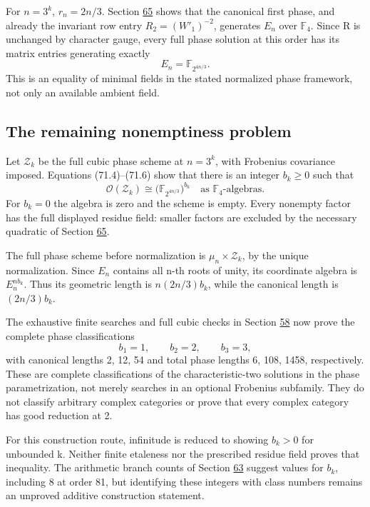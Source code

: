 \documentclass[11pt,reqno]{amsart}
\theoremstyle{plain}
\begin{document}
For \(n=3^k\), \(r_n=2n/3\). Section \hyperref[sec:65]{65} shows that the
canonical first phase, and already the invariant row entry
\(R_2=(W'_1)^{-2}\), generates \(E_n\) over \(\mathbb F_4\).
Since R is unchanged by character gauge, every full phase solution
at this order has its matrix entries generating exactly
\begin{equation*}
 \boxed{E_n=\mathbb F_{2^{4n/3}}.} \tag{71.6}
\end{equation*}
This is an equality of minimal fields in the stated normalized
phase framework, not only an available ambient field.

\subsection{The remaining nonemptiness problem}\label{sec:71.4}

Let \(\mathcal Z_k\) be the full cubic phase scheme at
\(n=3^k\), with Frobenius covariance imposed. Equations
(71.4)--(71.6) show that there is an integer \(b_k\ge0\) such
that
\begin{equation*}
 \boxed{\displaystyle
 \mathcal O(\mathcal Z_k)\cong
 \bigl(\mathbb F_{2^{4n/3}}\bigr)^{b_k}
 \quad\text{as }\mathbb F_4\text{-algebras}.}
 \tag{71.7}
\end{equation*}
For \(b_k=0\) the algebra is zero and the scheme is empty.
Every nonempty factor has the full displayed residue field:
smaller factors are excluded by the necessary quadratic of
Section \hyperref[sec:65]{65}.

The full phase scheme before normalization is
\(\mu_n\times\mathcal Z_k\), by the unique normalization.
Since \(E_n\) contains all n-th roots of unity, its coordinate
algebra is \(E_n^{n b_k}\). Thus its geometric length is
\(n(2n/3)b_k\), while the canonical length is \((2n/3)b_k\).

The exhaustive finite searches and full cubic checks in Section \hyperref[sec:58]{58}
now prove the complete phase classifications
\[
 b_1=1,\qquad b_2=2,\qquad b_3=3,
\]
with canonical lengths 2, 12, 54 and total phase lengths 6, 108,
1458, respectively. These are complete classifications of the
characteristic-two solutions in the phase parametrization, not
merely searches in an optional Frobenius subfamily. They do not
classify arbitrary complex categories or prove that every complex
category has good reduction at 2.

For this construction route, infinitude is reduced to showing
\(b_k>0\) for unbounded k. Neither finite etaleness nor the
prescribed residue field proves that inequality. The arithmetic
branch counts of Section \hyperref[sec:63]{63} suggest values for \(b_k\), including
8 at order 81, but identifying these integers with class numbers
remains an unproved additive construction statement.
\end{document}
